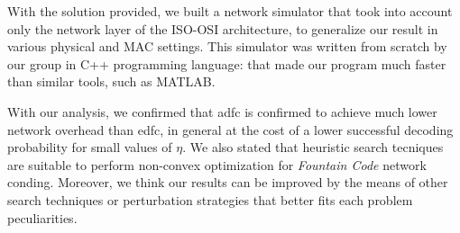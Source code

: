 \documentclass[12pt,journal,draftclsnofoot,onecolumn]{IEEEtran}
\begin{document}
With the solution provided, we built a network simulator that took into account only the network layer of the ISO-OSI architecture, to generalize our result in various physical and \textsc{MAC} settings.
This simulator was written from scratch by our group in C++ programming language: that made our program much faster than similar tools, such as MATLAB\textregistered.

With our analysis, we confirmed that \gls{adfc} is confirmed to achieve much lower network overhead than \gls{edfc}, in general at the cost of a lower successful decoding probability for small values of $\eta$.
We also stated that heuristic search tecniques are suitable to perform non-convex optimization for \emph{Fountain Code} network conding.
Moreover, we think our results can be improved by the means of other search techniques or perturbation strategies that better fits each problem peculiarities.



\end{document}
